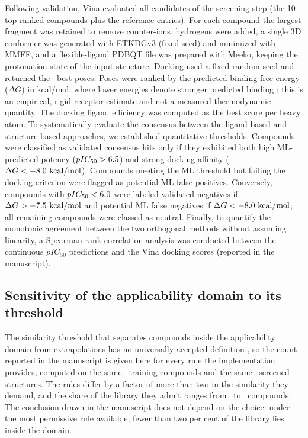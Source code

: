 \documentclass[a4paper,11pt]{article}
\begin{document}
Following validation, Vina evaluated all \DockNTotal{} candidates of the screening step (the 10 top-ranked compounds plus the reference entries). For each compound the largest fragment was retained to remove counter-ions, hydrogens were added, a single 3D conformer was generated with ETKDGv3 (fixed seed) and minimized with MMFF, and a flexible-ligand PDBQT file was prepared with Meeko, keeping the protonation state of the input structure. Docking used a fixed random seed and returned the \DockNPoses\ best poses. Poses were ranked by the predicted binding free energy ($\Delta G$) in kcal/mol, where lower energies denote stronger predicted binding \citep{feng2023}; this is an empirical, rigid-receptor estimate and not a measured thermodynamic quantity. The docking ligand efficiency was computed as the best score per heavy atom. To systematically evaluate the consensus between the ligand-based and structure-based approaches, we established quantitative thresholds. Compounds were classified as validated consensus hits only if they exhibited both high ML-predicted potency ($pIC_{50} > 6.5$) and strong docking affinity ($\Delta G < -8.0\text{ kcal/mol}$). Compounds meeting the ML threshold but failing the docking criterion were flagged as potential ML false positives. Conversely, compounds with $pIC_{50} < 6.0$ were labeled validated negatives if $\Delta G > -7.5\text{ kcal/mol}$ and potential ML false negatives if $\Delta G < -8.0\text{ kcal/mol}$; all remaining compounds were classed as neutral. Finally, to quantify the monotonic agreement between the two orthogonal methods without assuming linearity, a Spearman rank correlation analysis was conducted between the continuous $pIC_{50}$ predictions and the Vina docking scores (reported in the manuscript).


\subsection*{Sensitivity of the applicability domain to its threshold}

The similarity threshold that separates compounds inside the applicability domain from extrapolations has no
universally accepted definition \citep{sahigara2012, heberger2023}, so the count reported in the manuscript is given
here for every rule the implementation provides, computed on the same \ScreenNTrainMols\ training compounds and the
same \ScreenNStructural\ screened structures. The rules differ by a factor of more than two in the similarity they
demand, and the share of the library they admit ranges from \ScreenADSensitivityMin\ to \ScreenADSensitivityMax\
compounds. The conclusion drawn in the manuscript does not depend on the choice: under the most permissive rule
available, fewer than two per cent of the library lies inside the domain.
\end{document}
